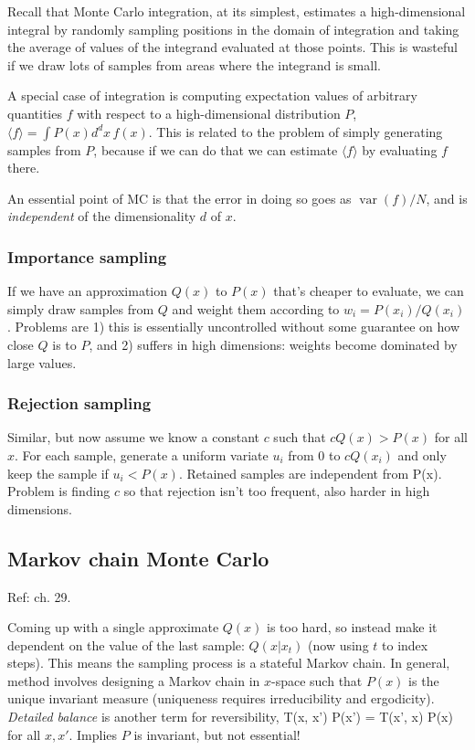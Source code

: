 \documentclass[notitlepage,openany,11pt]{report}
\DeclareMathOperator{\var}{var}
\theoremstyle{plain}%
\numberwithin{equation}{section}
\begin{document}
Recall that Monte Carlo integration, at its simplest, estimates a high-dimensional integral by randomly sampling positions in the domain of integration  and taking the average of values of the integrand evaluated at those points. This is wasteful if we draw lots of samples from areas where the integrand is small.

A special case of integration is computing expectation values of arbitrary quantities $f$ with respect to a high-dimensional distribution $P$, $\langle f \rangle = \int \! P(x) d^{d} x \, f(x)$. This is related to the problem of simply generating samples from $P$, because if we can do that we can estimate  $\langle f \rangle$ by evaluating $f$ there. 

An essential point of MC is that the error in doing so goes as $\var(f) / N$, and is \emph{independent} of the dimensionality $d$ of $x$. 

\subsubsection{Importance sampling} 
If we have an approximation $Q(x)$ to $P(x)$ that's cheaper to evaluate, we can simply draw samples from $Q$ and weight them according to $w_{i} = P(x_{i}) / Q(x_{i})$. Problems are 1) this is essentially uncontrolled without some guarantee on how close $Q$ is to $P$, and 2) suffers in high dimensions: weights become dominated by large values.

\subsubsection{Rejection sampling} 
Similar, but now assume we know a constant $c$ such that $cQ(x) > P(x)$ for all $x$. For each sample, generate a uniform variate $u_{i}$ from $0$ to $cQ(x_{i})$ and only keep the sample if $u_{i} < P(x)$. Retained samples are independent from P(x). Problem is finding $c$ so that rejection isn't too frequent, also harder in high dimensions.

\subsection{Markov chain Monte Carlo} 
Ref: \cite{MacKay:03} ch. 29.

Coming up with a single approximate $Q(x)$ is too hard, so instead make it dependent on the value of the last sample: $Q(x| x_{t})$ (now using $t$ to index steps). This means the sampling process is a stateful Markov chain. In general, method involves designing a Markov chain in $x$-space such that $P(x)$ is the unique invariant measure (uniqueness requires irreducibility and ergodicity). \emph{Detailed balance} is another term for reversibility,
\be
T(x, x') P(x') = T(x', x) P(x)
\ee
for all $x, x'$. Implies $P$ is invariant, but not essential!
\end{document}
